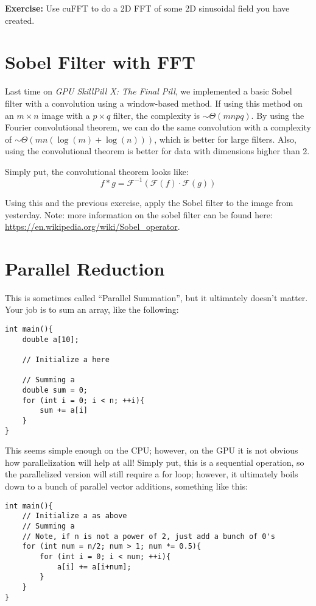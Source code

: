 \documentclass[11pt]{article}
\begin{document}
\textbf{Exercise:} Use cuFFT to do a 2D FFT of some 2D sinusoidal field you have created.

\newpage

\section*{Sobel Filter with FFT}

Last time on \textit{GPU SkillPill X: The Final Pill}, we implemented a basic Sobel filter with a convolution using a window-based method. If using this method on an $m \times n$ image with a $p \times q$ filter, the complexity is $\sim \Theta(mnpq)$. By using the Fourier convolutional theorem, we can do the same convolution with a complexity of $\sim \Theta(mn(\log (m) + \log (n)))$, which is better for large filters. Also, using the convolutional theorem is better for data with dimensions higher than 2.

Simply put, the convolutional theorem looks like:
$$
f * g = \mathscr{F}^{-1}(\mathscr{F}(f)\cdot\mathscr{F}(g))
$$

Using this and the previous exercise, apply the Sobel filter to the image from yesterday. Note: more information on the sobel filter can be found here: \url{https://en.wikipedia.org/wiki/Sobel_operator}.
\newpage

\section*{Parallel Reduction}

This is sometimes called ``Parallel Summation'', but it ultimately doesn't matter. Your job is to sum an array, like the following:

\begin{lstlisting}
int main(){
    double a[10];
    
    // Initialize a here
    
    // Summing a
    double sum = 0;
    for (int i = 0; i < n; ++i){
        sum += a[i]
    }
}
\end{lstlisting}

This seems simple enough on the CPU; however, on the GPU it is not obvious how parallelization will help at all! Simply put, this is a sequential operation, so the parallelized version will still require a for loop; however, it ultimately boils down to a bunch of parallel vector additions, something like this:

\begin{lstlisting}
int main(){
    // Initialize a as above
    // Summing a
    // Note, if n is not a power of 2, just add a bunch of 0's
    for (int num = n/2; num > 1; num *= 0.5){
        for (int i = 0; i < num; ++i){
            a[i] += a[i+num];
        }
    }
}
\end{lstlisting}
\end{document}
